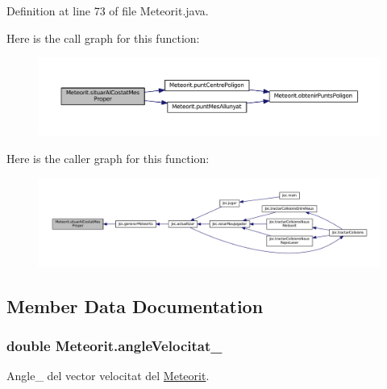 Definition at line 73 of file Meteorit.\+java.



Here is the call graph for this function\+:\nopagebreak
\begin{figure}[H]
\begin{center}
\leavevmode
\includegraphics[width=350pt]{class_meteorit_ab1e8e957f4ba216253d211523f2b3091_cgraph}
\end{center}
\end{figure}




Here is the caller graph for this function\+:
\nopagebreak
\begin{figure}[H]
\begin{center}
\leavevmode
\includegraphics[width=350pt]{class_meteorit_ab1e8e957f4ba216253d211523f2b3091_icgraph}
\end{center}
\end{figure}




\subsection{Member Data Documentation}
\hypertarget{class_meteorit_ae642e495aeb2d78122cb2ae550dde61b}{}
\subsubsection[{angle\+Velocitat\+\_\+}]{\setlength{\rightskip}{0pt plus 5cm}double Meteorit.\+angle\+Velocitat\+\_\+\hspace{0.3cm}{\ttfamily [private]}}\label{class_meteorit_ae642e495aeb2d78122cb2ae550dde61b}


Angle\+\_\+ del vector velocitat del \hyperlink{class_meteorit}{Meteorit}. 




